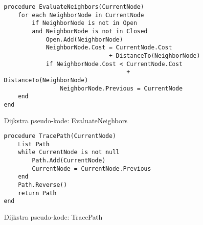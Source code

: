 \begin{figure}[H]
\begin{lstlisting}
procedure EvaluateNeighbors(CurrentNode)
	for each NeighborNode in CurrentNode
    	if NeighborNode is not in Open
    	and NeighborNode is not in Closed
    		Open.Add(NeighborNode)
			NeighborNode.Cost = CurrentNode.Cost 
    						  + DistanceTo(NeighborNode)
			if NeighborNode.Cost < CurrentNode.Cost
								   + DistanceTo(NeighborNode)
				NeighborNode.Previous = CurrentNode
	end
end
\end{lstlisting}
\caption{Dijkstra pseudo-kode: EvaluateNeighbors}\label{DijkstraCodeEvaluateNeighbors}
\end{figure}

\begin{figure}[H]
\begin{lstlisting}
procedure TracePath(CurrentNode)
	List Path
	while CurrentNode is not null
		Path.Add(CurrentNode)
		CurrentNode = CurrentNode.Previous
	end
	Path.Reverse()
	return Path
end
\end{lstlisting}
\caption{Dijkstra pseudo-kode: TracePath}\label{DijkstraCodeTracePath}
\end{figure}